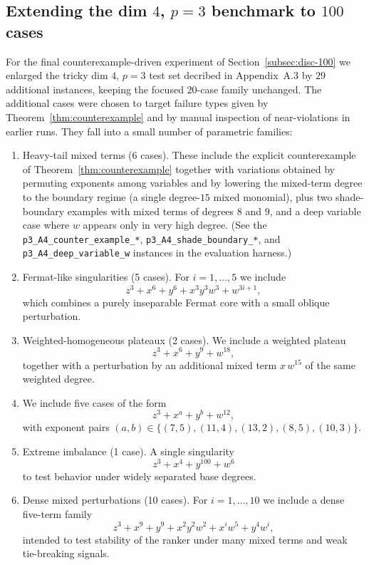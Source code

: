 \documentclass[11pt]{amsart}
\begin{document}
\subsection{Extending the dim $4$, $p=3$ benchmark to $100$ cases}
\label{app:benchmark100}

For the final counterexample-driven experiment of Section~\ref{subsec:disc-100} we enlarged the
tricky dim $4$, $p=3$ test set decribed in Appendix~A.3 by $29$ additional instances, keeping the focused
$20$-case family unchanged. The additional cases were chosen to target failure types given by Theorem~\ref{thm:counterexample} and by
manual inspection of near-violations in earlier runs.  They fall into a small number of parametric families:

\begin{enumerate}[leftmargin=*]
\item Heavy-tail mixed terms (6 cases).
These include the explicit counterexample of Theorem~\ref{thm:counterexample} together with variations obtained by permuting exponents among variables and by lowering the mixed-term degree
to the boundary regime (a single degree-$15$ mixed monomial), plus two shade-boundary examples
with mixed terms of degrees $8$ and $9$, and a deep variable case where $w$ appears only in very high degree.
(See the \texttt{p3\_A4\_counter\_example\_*}, \texttt{p3\_A4\_shade\_boundary\_*}, and \texttt{p3\_A4\_deep\_variable\_w}
instances in the evaluation harness.)
\item Fermat-like singularities (5 cases).
For $i=1,\dots,5$ we include
\[
z^3 + x^6 + y^6 + x^3y^3w^3 + w^{3i+1},
\]
which combines a purely inseparable Fermat core with a small oblique perturbation.
\item Weighted-homogeneous plateaux (2 cases).
We include a weighted plateau
\[
z^3 + x^6 + y^9 + w^{18},
\]
together with a perturbation by an additional mixed term $x\,w^{15}$ of the same weighted degree.

\item We include five cases of the form
\[
z^3 + x^{a} + y^{b} + w^{12},
\]
with exponent pairs $(a,b)\in\{(7,5),(11,4),(13,2),(8,5),(10,3)\}$.

\item Extreme imbalance (1 case). A single singularity
\[
z^3 + x^4 + y^{100} + w^6
\]
to test behavior under widely separated base degrees.

\item Dense mixed perturbations (10 cases). 
For $i=1,\dots,10$ we include a dense five-term family
\[
z^3 + x^9 + y^9 + x^2y^2w^2 + x^{i}w^5 + y^4w^{i},
\]
intended to test stability of the ranker under many mixed terms and weak tie-breaking signals.
\end{enumerate}
\end{document}
